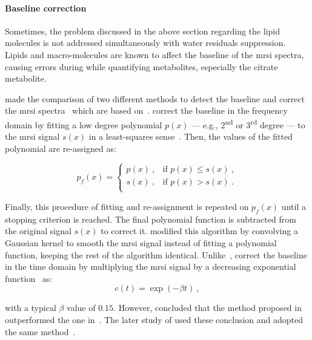 \paragraph{Baseline correction} Sometimes, the problem discussed in the above section regarding the lipid molecules is not addressed simultaneously with water residuals suppression.
Lipids and macro-molecules are known to affect the baseline of the \ac{mrsi} spectra, causing errors during while quantifying metabolites, especially the citrate metabolite.

\citeauthor{Parfait2012} made the comparison of two different methods to detect the baseline and correct the \ac{mrsi} spectra~\cite{Parfait2012} which are based on~\cite{Lieber2003,Devos2004}.
\citeauthor{Lieber2003} correct the baseline in the frequency domain by fitting a low degree polynomial $p(x)$ --- e.g., 2\textsuperscript{nd} or 3\textsuperscript{rd} degree --- to the \ac{mrsi} signal $s(x)$ in a least-squares sense~\cite{Lieber2003}.
Then, the values of the fitted polynomial are re-assigned as:

\begin{equation}
	p_f(x) = 
	\begin{cases}
		p(x) \ , & \text{if $p(x) \leq s(x)$} \ , \\
		s(x) \ , & \text{if $p(x) > s(x)$} \ . \\
	\end{cases}
	\label{eq:lieber}
\end{equation}

Finally, this procedure of fitting and re-assignment is repeated on $p_f(x)$ until a stopping criterion is reached.
The final polynomial function is subtracted from the original signal $s(x)$ to correct it.
\cite{Parfait2012} modified this algorithm by convolving a Gaussian kernel to smooth the \ac{mrsi} signal instead of fitting a polynomial function, keeping the rest of the algorithm identical. 
Unlike~\citeauthor{Lieber2003}, \citeauthor{Devos2004} correct the baseline in the time domain by multiplying the \ac{mrsi} signal by a decreasing exponential function~\cite{Devos2004} as:
\begin{equation}
	c(t) = \exp (- \beta t) \ ,
	\label{eq:devos}
\end{equation}

\noindent with a typical $\beta$ value of $0.15$.
However, \citeauthor{Parfait2012} concluded that the method proposed in~\cite{Lieber2003} outperformed the one in~\cite{Devos2004}.
The later study of \citeauthor{trigui2017automatic} used these conclusion and adopted the same method~\cite{trigui2016classification,trigui2017automatic}.

